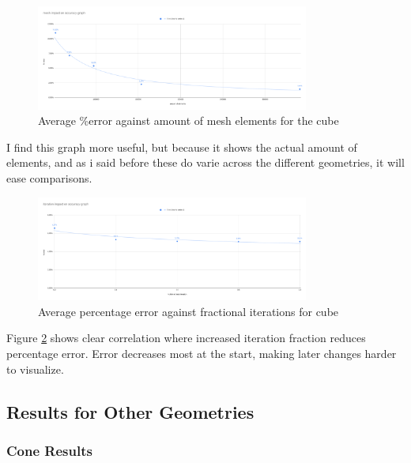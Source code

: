 \documentclass[12pt,a4paper]{article}
\begin{document}
\begin{figure}[H]
\centering
\includegraphics[width=0.8\textwidth]{image14.png}
\caption{Average \%error against amount of mesh elements for the cube}
\label{fig:cube_elements_error}
\end{figure}

I find this graph more useful, but because it shows the actual amount of elements, and as i said before these do varie across the different geometries, it will ease comparisons.

\begin{figure}[H]
    \centering
    \includegraphics[width=0.8\textwidth]{image5.png}
    \caption{Average percentage error against fractional iterations for cube}
    \label{fig:cube_iterations_error}
\end{figure}

Figure \ref{fig:cube_iterations_error} shows clear correlation where increased iteration fraction reduces percentage error. Error decreases most at the start, making later changes harder to visualize.

\subsection{Results for Other Geometries}

\subsubsection{Cone Results}
\end{document}
